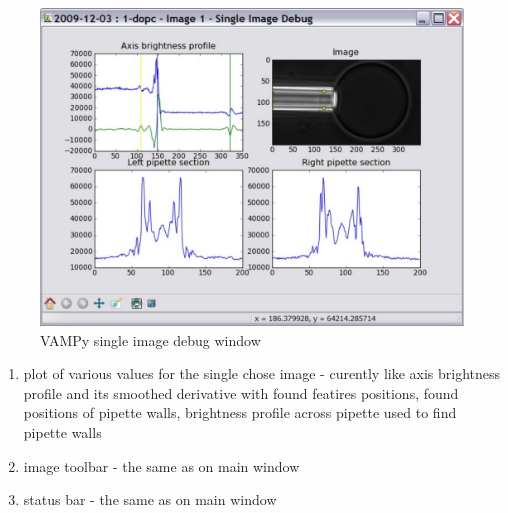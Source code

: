 \begin{itemize}
\begin{figure}[htbp]
			\includegraphics[width=1.00\textwidth]{figs/vampydebug.pdf}
			\caption{VAMPy single image debug window}
			\label{fig:vampydebug}
		\end{figure}
		\begin{enumerate}
			\item plot of various values for the single chose image - curently like axis brightness profile and its smoothed derivative with found featires positions, found positions of pipette walls, brightness profile across pipette used to find pipette walls
			\item image toolbar - the same as on main window
			\item status bar - the same as on main window
		\end{enumerate}
\end{itemize}

